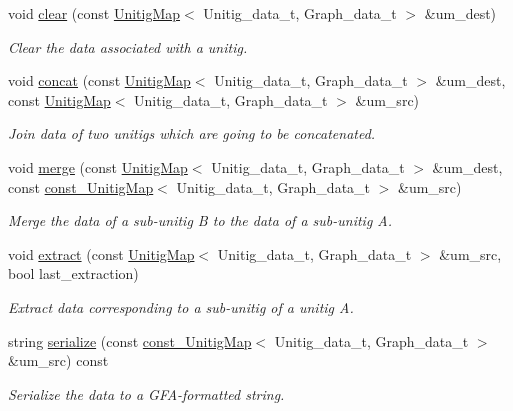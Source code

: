 \begin{DoxyCompactItemize}
\item 
void \hyperlink{classCDBG__Data__t_ad3ee42fef3155251e54886f3649f72a2}{clear} (const \hyperlink{classUnitigMap}{Unitig\+Map}$<$ Unitig\+\_\+data\+\_\+t, Graph\+\_\+data\+\_\+t $>$ \&um\+\_\+dest)
\begin{DoxyCompactList}\small\item\em Clear the data associated with a unitig. \end{DoxyCompactList}\item 
void \hyperlink{classCDBG__Data__t_a1d1eefcc5b100fbe000a5d70c4280aa3}{concat} (const \hyperlink{classUnitigMap}{Unitig\+Map}$<$ Unitig\+\_\+data\+\_\+t, Graph\+\_\+data\+\_\+t $>$ \&um\+\_\+dest, const \hyperlink{classUnitigMap}{Unitig\+Map}$<$ Unitig\+\_\+data\+\_\+t, Graph\+\_\+data\+\_\+t $>$ \&um\+\_\+src)
\begin{DoxyCompactList}\small\item\em Join data of two unitigs which are going to be concatenated. \end{DoxyCompactList}\item 
void \hyperlink{classCDBG__Data__t_a474f0f1668ae99e7ca0ee071d1f6f237}{merge} (const \hyperlink{classUnitigMap}{Unitig\+Map}$<$ Unitig\+\_\+data\+\_\+t, Graph\+\_\+data\+\_\+t $>$ \&um\+\_\+dest, const \hyperlink{CompactedDBG_8hpp_a631369597e56604279ba89a211c14fd0}{const\+\_\+\+Unitig\+Map}$<$ Unitig\+\_\+data\+\_\+t, Graph\+\_\+data\+\_\+t $>$ \&um\+\_\+src)
\begin{DoxyCompactList}\small\item\em Merge the data of a sub-\/unitig B to the data of a sub-\/unitig A. \end{DoxyCompactList}\item 
void \hyperlink{classCDBG__Data__t_a2e78ea1698f48c521164b8294435f618}{extract} (const \hyperlink{classUnitigMap}{Unitig\+Map}$<$ Unitig\+\_\+data\+\_\+t, Graph\+\_\+data\+\_\+t $>$ \&um\+\_\+src, bool last\+\_\+extraction)
\begin{DoxyCompactList}\small\item\em Extract data corresponding to a sub-\/unitig of a unitig A. \end{DoxyCompactList}\item 
string \hyperlink{classCDBG__Data__t_a4c6ec7ef1a4ca46bd643f59d25730945}{serialize} (const \hyperlink{CompactedDBG_8hpp_a631369597e56604279ba89a211c14fd0}{const\+\_\+\+Unitig\+Map}$<$ Unitig\+\_\+data\+\_\+t, Graph\+\_\+data\+\_\+t $>$ \&um\+\_\+src) const
\begin{DoxyCompactList}\small\item\em Serialize the data to a G\+F\+A-\/formatted string. \end{DoxyCompactList}\end{DoxyCompactItemize}


